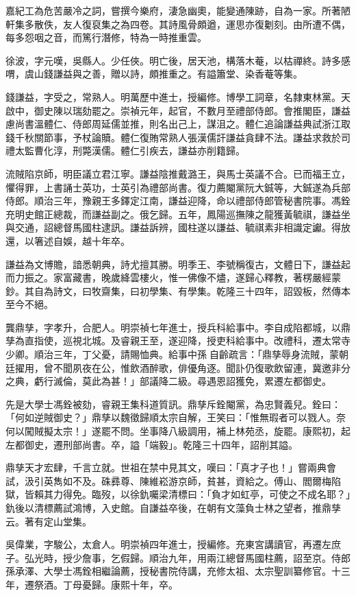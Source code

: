 \begin{pinyinscope}
嘉紀工為危苦嚴冷之詞，嘗撰今樂府，淒急幽奧，能變通陳跡，自為一家。所著陋軒集多散佚，友人復裒集之為四卷。其詩風骨頗遒，運思亦復劖刻。由所遭不偶，每多怨咽之音，而篤行潛修，特為一時推重雲。

徐波，字元嘆，吳縣人。少任俠。明亡後，居天池，構落木菴，以枯禪終。詩多感喟，虞山錢謙益與之善，贈以詩，頗推重之。有謚簫堂、染香菴等集。

錢謙益，字受之，常熟人。明萬歷中進士，授編修。博學工詞章，名隸東林黨。天啟中，御史陳以瑞劾罷之。崇禎元年，起官，不數月至禮部侍郎。會推閣臣，謙益慮尚書溫體仁、侍郎周延儒並推，則名出己上，謀沮之。體仁追論謙益典試浙江取錢千秋關節事，予杖論贖。體仁復賄常熟人張漢儒訐謙益貪肆不法。謙益求救於司禮太監曹化淳，刑斃漢儒。體仁引疾去，謙益亦削籍歸。

流賊陷京師，明臣議立君江寧。謙益陰推戴潞王，與馬士英議不合。已而福王立，懼得罪，上書誦士英功，士英引為禮部尚書。復力薦閹黨阮大鋮等，大鋮遂為兵部侍郎。順治三年，豫親王多鐸定江南，謙益迎降，命以禮部侍郎管秘書院事。馮銓充明史館正總裁，而謙益副之。俄乞歸。五年，鳳陽巡撫陳之龍獲黃毓祺，謙益坐與交通，詔總督馬國柱逮訊。謙益訴辨，國柱遂以謙益、毓祺素非相識定讞。得放還，以箸述自娛，越十年卒。

謙益為文博贍，諳悉朝典，詩尤擅其勝。明季王、李號稱復古，文體日下，謙益起而力振之。家富藏書，晚歲絳雲樓火，惟一佛像不燼，遂歸心釋教，著楞嚴經蒙鈔。其自為詩文，曰牧齋集，曰初學集、有學集。乾隆三十四年，詔毀板，然傳本至今不絕。

龔鼎孳，字孝升，合肥人。明崇禎七年進士，授兵科給事中。李自成陷都城，以鼎孳為直指使，巡視北城。及睿親王至，遂迎降，授吏科給事中。改禮科，遷太常寺少卿。順治三年，丁父憂，請賜恤典。給事中孫自齡疏言：「鼎孳辱身流賊，蒙朝廷擢用，曾不聞夙夜在公，惟飲酒醉歌，俳優角逐。聞訃仍復歌飲留連，冀邀非分之典，虧行滅倫，莫此為甚！」部議降二級。尋遇恩詔獲免，累遷左都御史。

先是大學士馮銓被劾，睿親王集科道質訊。鼎孳斥銓閹黨，為忠賢義兒。銓曰：「何如逆賊御史？」鼎孳以魏徵歸順太宗自解，王笑曰：「惟無瑕者可以戮人。奈何以闖賊擬太宗！」遂罷不問。坐事降八級調用，補上林苑丞，旋罷。康熙初，起左都御史，遷刑部尚書。卒，謚「端毅」。乾隆三十四年，詔削其謚。

鼎孳天才宏肆，千言立就。世祖在禁中見其文，嘆曰：「真才子也！」嘗兩典會試，汲引英雋如不及。硃彞尊、陳維崧游京師，貧甚，資給之。傅山、閻爾梅陷獄，皆賴其力得免。臨歿，以徐釚囑梁清標曰：「負才如虹亭，可使之不成名耶？」釚後以清標薦試鴻博，入史館。自謙益卒後，在朝有文藻負士林之望者，推鼎孳云。著有定山堂集。

吳偉業，字駿公，太倉人。明崇禎四年進士，授編修。充東宮講讀官，再遷左庶子。弘光時，授少詹事，乞假歸。順治九年，用兩江總督馬國柱薦，詔至京。侍郎孫承澤、大學士馮銓相繼論薦，授秘書院侍講，充修太祖、太宗聖訓纂修官。十三年，遷祭酒。丁母憂歸。康熙十年，卒。


\end{pinyinscope}
